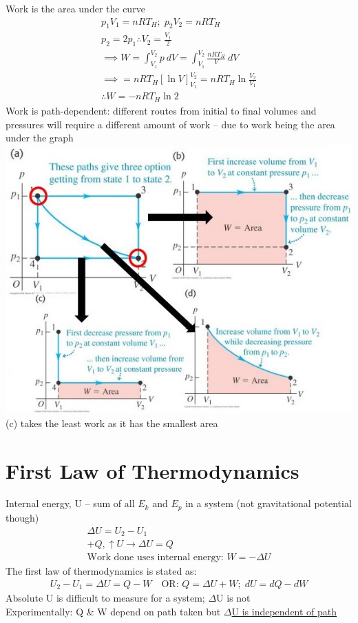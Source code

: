 \documentclass[a4paper, 11pt, fleqn, normalem]{report}
\begin{document}
Work is the area under the curve
\begin{gather*}
	p_{1}V_{1} = nRT_{H}; \; p_{2}V_{2} = nRT_{H} \\
	p_{2} = 2p_{1} \therefore V_{2} = \frac{V_{1}}{2} \\
	\implies W = \int_{V_{1}}^{V_{2}} p\:dV = \int_{V_{1}}^{V_{2}} \frac{nRT_{H}}{V}\:dV \\
	\implies = nRT_{H}[\ln{V}]_{V_{1}}^{V_{2}} = nRT_{H}\ln{\frac{V_{2}}{V_{1}}} \\
	\therefore W = -nRT_{H}\ln{2}
\end{gather*}
Work is path-dependent: different routes from initial to final volumes and pressures will require a different amount of work -- due to work being the area under the graph \\
\includegraphics[scale=0.8]{Paths.jpg} \\
(c) takes the least work as it has the smallest area

\section{First Law of Thermodynamics}
Internal energy, U -- sum of all $E_{k}$ and $E_{p}$ in a system (not gravitational potential though)
\begin{gather*}
	{\Delta}U = U_{2} - U_{1} \\
	+ Q, \uparrow U \rightarrow {\Delta}U = Q \\
	\text{Work done uses internal energy: } W = -{\Delta}U
\end{gather*}
The first law of thermodynamics is stated as:
\begin{gather*}
	U_{2} - U_{1} = {\Delta}U = Q - W \quad \text{OR: } Q = {\Delta}U + W; \; dU = dQ - dW
\end{gather*}
Absolute U is difficult to measure for a system; $\Delta$U is not \\
Experimentally: Q \& W depend on path taken but \underline{$\Delta$U is independent of path}
\end{document}
